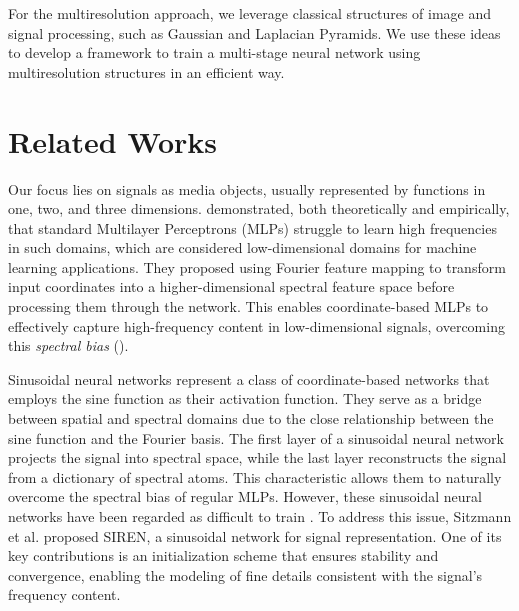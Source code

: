 For the multiresolution approach, we leverage classical structures of image and signal processing, such as Gaussian and Laplacian Pyramids. We use these ideas to develop a framework to train a multi-stage neural network using multiresolution structures in an efficient way. 


\section{Related Works}

Our focus lies on signals as media objects, usually represented by functions in one, two, and three dimensions. \cite{tancik2020fourfeat} demonstrated, both theoretically and empirically, that standard Multilayer Perceptrons (MLPs) struggle to learn high frequencies in such domains, which are considered low-dimensional domains for machine learning applications. They proposed using Fourier feature mapping to transform input coordinates into a higher-dimensional spectral feature space before processing them through the network. This enables coordinate-based MLPs to effectively capture high-frequency content in low-dimensional signals, overcoming this \textit{spectral bias} (\cite{rahaman2018spectral}).

Sinusoidal neural networks represent a class of coordinate-based networks that employs the sine function as their activation function. They serve as a bridge between spatial and spectral domains due to the close relationship between the sine function and the Fourier basis. The first layer of a sinusoidal neural network projects the signal into spectral space, while the last layer reconstructs the signal from a dictionary of spectral atoms. This characteristic allows them to naturally overcome the spectral bias of regular MLPs. However, these sinusoidal neural networks have been regarded as difficult to train \cite{taming2017}. To address this issue, Sitzmann et al. \cite{sitzmann2019siren} proposed SIREN, a sinusoidal network for signal representation. One of its key contributions is an initialization scheme that ensures stability and convergence, enabling the modeling of fine details consistent with the signal’s frequency content.

